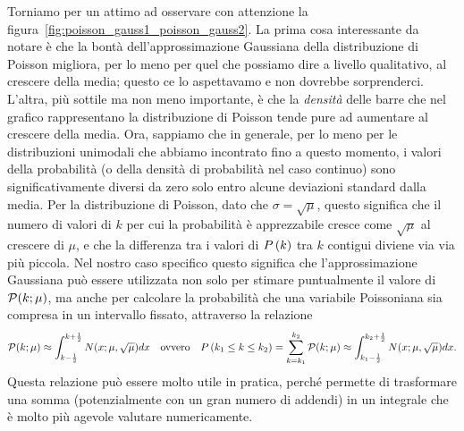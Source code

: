 Torniamo per un attimo ad osservare con attenzione la
figura~\ref{fig:poisson_gauss1_poisson_gauss2}. La prima cosa interessante da
notare è che la bontà dell'approssimazione Gaussiana della distribuzione
di Poisson migliora, per lo meno per quel che possiamo dire a livello
qualitativo, al crescere della media; questo ce lo aspettavamo e non dovrebbe
sorprenderci. L'altra, più sottile ma non meno importante, è che la
\emph{densità} delle barre che nel grafico rappresentano la distribuzione
di Poisson tende pure ad aumentare al crescere della media. Ora, sappiamo che
in generale, per lo meno per le distribuzioni unimodali che abbiamo incontrato
fino a questo momento, i valori della probabilità (o della densità di
probabilità nel caso continuo) sono significativamente diversi da zero solo
entro alcune deviazioni standard dalla media. Per la distribuzione di Poisson,
dato che $\sigma = \sqrt{\mu}$, questo significa che il numero di valori di $k$
per cui la probabilità è apprezzabile cresce come $\sqrt{\mu}$ al crescere
di $\mu$, e che la differenza tra i valori di $\displaystyle P\left(k\right)$ tra $k$ contigui
diviene via via più piccola. Nel nostro caso specifico questo significa che
l'approssimazione Gaussiana può essere utilizzata non solo per stimare
puntualmente il valore di $\poissonpdf[\mu]{k}$, ma anche per calcolare
la probabilità che una variabile Poissoniana sia compresa in un intervallo
fissato, attraverso la relazione
\begin{align}
  \poissonpdf[\mu]{k} \approx
  \int_{k - \frac{1}{2}}^{k + \frac{1}{2}} \gausspdf[\mu, \sqrt{\mu}]{x} dx
  \quad \text{ovvero} \quad
  \prob{k_1 \leq k \leq k_2} = \sum_{k = k_1}^{k_2} \poissonpdf[\mu]{k} \approx
  \int_{k_1 - \frac{1}{2}}^{k_2 + \frac{1}{2}} \gausspdf[\mu, \sqrt{\mu}]{x} dx.
\end{align}
Questa relazione può essere molto utile in pratica, perché permette di
trasformare una somma (potenzialmente con un gran numero di addendi) in un
integrale che è molto più agevole valutare numericamente.

